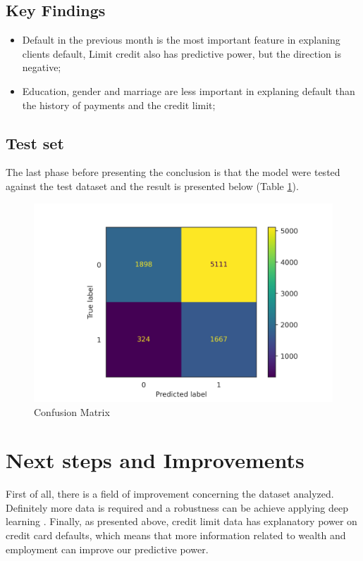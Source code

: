 \documentclass[11pt, a4]{article}
\begin{document}
\subsection*{Key Findings}

\begin{itemize}
\item Default in the previous month is the most important feature in explaning clients default, Limit credit also has predictive power, but the direction is negative;
\item Education, gender and marriage are less important in explaning default than the history of payments and the credit limit;

\end{itemize}

\subsection*{Test set}

The last phase before presenting the conclusion is that the model were tested against the test dataset and the result is presented below (Table \ref{fig:Confusion Matrix}).

\begin{figure}
\includegraphics[]{confusion}
\centering
\caption{Confusion Matrix}
\label{fig:Confusion Matrix}
\end{figure}


\section*{Next steps and Improvements}

First of all, there is a field of improvement concerning the dataset analyzed. Definitely more data is required and a robustness can be achieve applying deep learning \cite{Yeh}. Finally, as presented above, credit limit data has explanatory power on credit card defaults, which means that more information related to wealth and employment can improve our predictive power.
\end{document}
